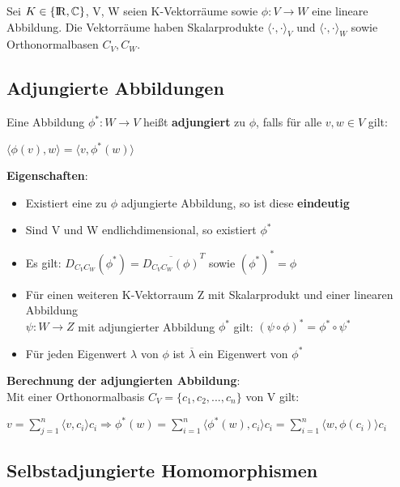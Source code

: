 \documentclass[10pt,a4paper]{article}
\def\realnumbers{{\rm I\!R}}
\def\complexnumbers{{\mathbb{C}}}
\begin{document}
	Sei $K \in \{\realnumbers, \complexnumbers\}$, V, W seien K-Vektorräume sowie $\phi: V \rightarrow W$ eine lineare Abbildung. Die Vektorräume haben Skalarprodukte $\langle \cdot, \cdot\rangle_V$ und $\langle \cdot, \cdot\rangle_W$ sowie Orthonormalbasen $C_V, C_W$.
	
	\subsection{Adjungierte Abbildungen}
	\label{aa:sub:adjungierte_abbildungen}

	Eine Abbildung $\phi^*: W \rightarrow V$ heißt \textbf{adjungiert} zu $\phi$, falls für alle $v, w \in V$ gilt:
	\begin{center}
		$\langle \phi(v), w\rangle = \langle v, \phi^*(w)\rangle$
	\end{center}
	\textbf{Eigenschaften}:
	\begin{itemize}
		\item Existiert eine zu $\phi$ adjungierte Abbildung, so ist diese \textbf{eindeutig}
		\item Sind V und W endlichdimensional, so existiert $\phi^*$
		\item Es gilt: $D_{C_VC_W}(\phi^*) = \overline{D_{C_VC_W}(\phi)}^T$ sowie $(\phi^*)^* = \phi$
		\item Für einen weiteren K-Vektorraum Z mit Skalarprodukt und einer linearen Abbildung\\ $\psi: W \rightarrow Z$ mit adjungierter Abbildung $\phi^*$ gilt: $(\psi \circ \phi)^* = \phi^* \circ \psi^*$
		\item Für jeden Eigenwert $\lambda$ von $\phi$ ist $\overline{\lambda}$ ein Eigenwert von $\phi^*$
	\end{itemize}
	\textbf{Berechnung der adjungierten Abbildung}:\\
	Mit einer Orthonormalbasis $C_V = \{c_1, c_2, ..., c_n\}$ von V gilt:
	\begin{center}
		$v = \sum_{j = 1}^{n}\langle v, c_i\rangle c_i \Rightarrow \phi^*(w) = \sum_{i = 1}^{n}\langle \phi^*(w), c_i\rangle c_i = \sum_{i = 1}^{n}\langle w, \phi(c_i)\rangle c_i$
	\end{center}
	
	\subsection{Selbstadjungierte Homomorphismen}
	\label{aa:sub:selbstadjungierte_homomorphismen}
\end{document}
